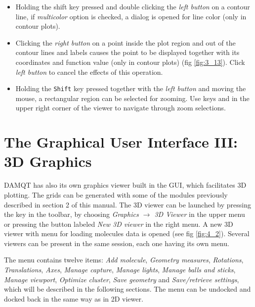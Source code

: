 \documentclass[10pt]{article}
\begin{document}
\begin{itemize}
\item Holding the shift key pressed and double clicking the  {\it left
button} on a contour line, if {\it multicolor} option is
checked, a dialog is opened for line color (only in contour plots).

\item Clicking the {\it right button} on a point inside the plot region and out
of the contour lines and labels causes the point to be displayed together with
its coordinates and function value (only in contour plots) (fig \ref{fig:3_13}). Click {\it left button} to cancel the
effects of this operation.

\item Holding the \texttt{Shift} key pressed together with the {\it left button} 
and moving the mouse, a rectangular
region can be selected for zooming. Use keys \zoomin{} 
and \zoomout{}  in the upper right corner of the viewer to navigate 
through zoom selections.
\end{itemize}



\newpage

\section{The Graphical User Interface III: 3D Graphics \label{sec:4}}

DAMQT has also its own graphics viewer built in the
GUI, which facilitates 3D plotting. The grids can be generated with  some of
the modules previously described in section 2 of this manual. 
The 3D viewer can be launched by pressing the key \bigtoolbV in the toolbar, by choosing {\it 
Graphics $\rightarrow$ 3D Viewer} in the upper menu or pressing the button labeled {\it New 3D 
viewer} in the right menu.
A new 3D viewer with menu for loading molecules data is opened (see fig \ref{fig:4_2}). 
Several viewers can be present in the same session, each one having its own menu.

The menu contains twelve items: {\it Add molecule}, {\it Geometry measures}, {\it Rotations}, {\it 
Translations}, {\it Axes}, {\it Manage capture},
{\it Manage lights}, {\it Manage balls and sticks}, {\it Manage viewport},  
{\it Optimize cluster}, {\it Save geometry} and {\it Save/retrieve settings}, which will be 
described in the following sections. The menu
can be undocked and docked back in the same way as in 2D viewer.
\end{document}

